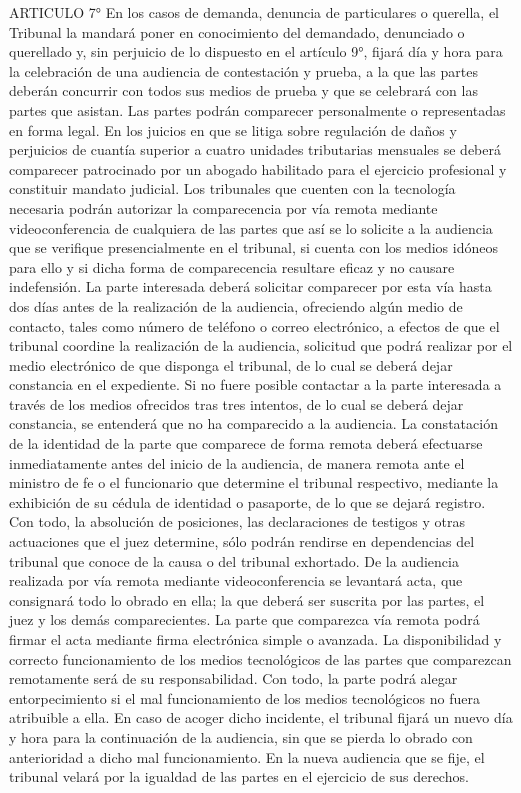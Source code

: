     ARTICULO 7° En los casos de demanda, denuncia de particulares o querella, el Tribunal la mandará poner en conocimiento del demandado, denunciado o querellado y, sin perjuicio de lo dispuesto en el artículo 9°, fijará día y hora para la celebración de una audiencia de contestación y prueba, a la que las partes deberán concurrir con todos sus medios de prueba y que se celebrará con las partes que asistan.
    Las partes podrán comparecer personalmente o representadas en forma legal. En los juicios en que se litiga sobre regulación de daños y perjuicios de cuantía superior a cuatro unidades tributarias mensuales se deberá comparecer patrocinado por un abogado habilitado para el ejercicio profesional y constituir mandato judicial.
    Los tribunales que cuenten con la tecnología necesaria podrán autorizar la comparecencia por vía remota mediante videoconferencia de cualquiera de las partes que así se lo solicite a la audiencia que se verifique presencialmente en el tribunal, si cuenta con los medios idóneos para ello y si dicha forma de comparecencia resultare eficaz y no causare indefensión.
    La parte interesada deberá solicitar comparecer por esta vía hasta dos días antes de la realización de la audiencia, ofreciendo algún medio de contacto, tales como número de teléfono o correo electrónico, a efectos de que el tribunal coordine la realización de la audiencia, solicitud que podrá realizar por el medio electrónico de que disponga el tribunal, de lo cual se deberá dejar constancia en el expediente. Si no fuere posible contactar a la parte interesada a través de los medios ofrecidos tras tres intentos, de lo cual se deberá dejar constancia, se entenderá que no ha comparecido a la audiencia.
    La constatación de la identidad de la parte que comparece de forma remota deberá efectuarse inmediatamente antes del inicio de la audiencia, de manera remota ante el ministro de fe o el funcionario que determine el tribunal respectivo, mediante la exhibición de su cédula de identidad o pasaporte, de lo que se dejará registro.
    Con todo, la absolución de posiciones, las declaraciones de testigos y otras actuaciones que el juez determine, sólo podrán rendirse en dependencias del tribunal que conoce de la causa o del tribunal exhortado.
    De la audiencia realizada por vía remota mediante videoconferencia se levantará acta, que consignará todo lo obrado en ella; la que deberá ser suscrita por las partes, el juez y los demás comparecientes. La parte que comparezca vía remota podrá firmar el acta mediante firma electrónica simple o avanzada.
    La disponibilidad y correcto funcionamiento de los medios tecnológicos de las partes que comparezcan remotamente será de su responsabilidad. Con todo, la parte podrá alegar entorpecimiento si el mal funcionamiento de los medios tecnológicos no fuera atribuible a ella. En caso de acoger dicho incidente, el tribunal fijará un nuevo día y hora para la continuación de la audiencia, sin que se pierda lo obrado con anterioridad a dicho mal funcionamiento. En la nueva audiencia que se fije, el tribunal velará por la igualdad de las partes en el ejercicio de sus derechos.
